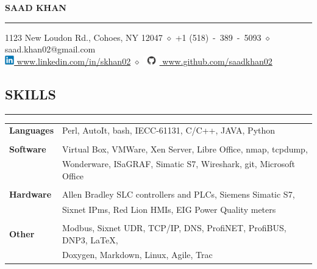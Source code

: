 \documentclass{article}
\begin{document}
%
\begin{center}
    {\MakeUppercase{\huge\bf Saad Khan}} \\
    \bigskip
    \hrule
    \bigskip
    1123 New Loudon Rd., Cohoes, NY 12047
    $\diamond$
    +1 (518)~-~389~-~5093
    $\diamond$
    saad.khan02@gmail.com
    \\
    \href{https://www.linkedin.com/in/skhan02}
         {\includegraphics[width=4mm]{linkedin.png} www.linkedin.com/in/skhan02}
    $\diamond$
    \href{https://www.github.com/saadkhan02}
         {\includegraphics[width=7mm]{github.png} www.github.com/saadkhan02}
    \\
    \bigskip
\end{center}

%
\subsection*{\MakeUppercase{\bf Skills}}
    \hrule
    \bigskip
    \begin{tabular}{l l}
    {\bfseries Languages} &
    Perl, AutoIt, bash, IECC-61131, C/C++, JAVA, Python \\
    \\
    {\bfseries Software} &
    Virtual Box, VMWare, Xen Server, Libre Office, nmap, tcpdump, \\
    &
    Wonderware, ISaGRAF, Simatic S7, Wireshark, git, Microsoft Office \\
    \\
    {\bfseries Hardware} &
    Allen Bradley SLC controllers and PLCs, Siemens Simatic S7, \\
    &
    Sixnet IPms, Red Lion HMIs, EIG Power Quality meters \\
    \\
    {\bfseries Other} &
    Modbus, Sixnet UDR, TCP/IP, DNS, ProfiNET, ProfiBUS, DNP3, \LaTeX, \\
    &
    Doxygen, Markdown, Linux, Agile, Trac \\
    \end{tabular}
    \bigskip

%
\end{document}
